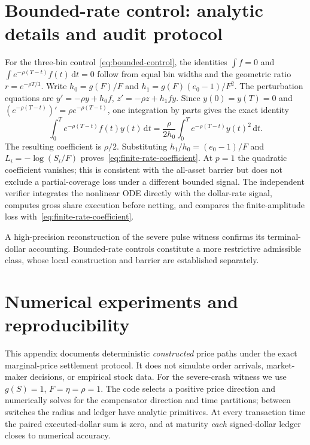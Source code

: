 \documentclass[11pt]{article}
\numberwithin{equation}{section}
\theoremstyle{definition}
\theoremstyle{remark}
\newcommand{\dd}{\,\mathrm{d}}
\begin{document}
\section{Bounded-rate control: analytic details and audit protocol}\label{app:rate}
For the three-bin control~\eqref{eq:bounded-control}, the identities $\int f=0$ and $\int e^{-\rho(T-t)}f(t)\dd t=0$ follow from equal bin widths and the geometric ratio $r=e^{-\rho T/3}$. Write $h_0=g(F)/F$ and $h_1=g(F)(e_0-1)/F^2$. The perturbation equations are $y'=-\rho y+h_0 f$, $z'=-\rho z+h_1fy$. Since $y(0)=y(T)=0$ and $(e^{-\rho(T-t)})'=\rho e^{-\rho(T-t)}$, one integration by parts gives the exact identity
\begin{equation}\label{eq:ibp}
\int_0^T e^{-\rho(T-t)}f(t)y(t)\dd t
=\frac{\rho}{2h_0}\int_0^T e^{-\rho(T-t)}y(t)^2\dd t.
\end{equation}
The resulting coefficient is $\rho/2$. Substituting $h_1/h_0=(e_0-1)/F$ and $L_i=-\log(S_i/F)$ proves~\eqref{eq:finite-rate-coefficient}. At $p=1$ the quadratic coefficient vanishes; this is consistent with the all-asset barrier but does not exclude a partial-coverage loss under a different bounded signal. The independent verifier integrates the nonlinear ODE directly with the dollar-rate signal, computes gross share execution before netting, and compares the finite-amplitude loss with~\eqref{eq:finite-rate-coefficient}.

A high-precision reconstruction of the severe pulse witness confirms its terminal-dollar accounting. Bounded-rate controls constitute a more restrictive admissible class, whose local construction and barrier are established separately.

\section{Numerical experiments and reproducibility}\label{app:numerics}
This appendix documents deterministic \emph{constructed} price paths under the exact marginal-price settlement protocol. It does not simulate order arrivals, market-maker decisions, or empirical stock data. For the severe-crash witness we use $g(S)=1$, $F=\eta=\rho=1$. The code selects a positive price direction and numerically solves for the compensator direction and time partitions; between switches the radius and ledger have analytic primitives. At every transaction time the paired executed-dollar sum is zero, and at maturity \emph{each} signed-dollar ledger closes to numerical accuracy.
\end{document}

